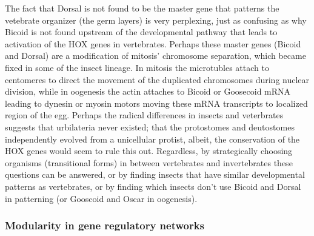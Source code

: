 The fact that Dorsal is not found to be the master gene that patterns the vetebrate organizer (the germ layers) is very perplexing, just as confusing as why Bicoid is not found upstream of the developmental pathway that leads to activation of the HOX genes in vertebrates.  Perhaps these master genes (Bicoid and Dorsal) are a modification of mitosis' chromosome separation, which became fixed in some of the insect lineage.  In mitosis the microtubles attach to centomeres to direct the movement of the duplicated chromosomes during nuclear division, while in oogenesis the actin attaches to Bicoid or Goosecoid mRNA leading to dynesin or myosin motors moving these mRNA transcripts to localized region of the egg.  Perhaps the radical differences in insects and veterbrates suggests that urbilateria never existed; that the protostomes and deutostomes independently evolved from a unicellular protist, albeit, the conservation of the HOX genes would seem to rule this out.  Regardless, by strategically choosing organisms (transitional forms) in between vertebrates and invertebrates these questions can be answered, or by finding insects that have similar developmental patterns as vertebrates, or by finding which insects don't use Bicoid and Dorsal in patterning (or Gooscoid and Oscar in oogenesis). 

\subsubsection{Modularity in gene regulatory networks}

